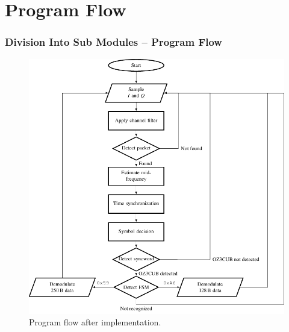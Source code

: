 \section{Program Flow}
\begin{frame} \frametitle{Division Into Sub Modules -- Program Flow}
    \begin{figure}[htbp]
        \centering
        \includegraphics[height=0.8\textheight]{img/program_flow}
        \caption{Program flow after implementation.}
        \label{fig:programflow1}
    \end{figure}
\end{frame}




